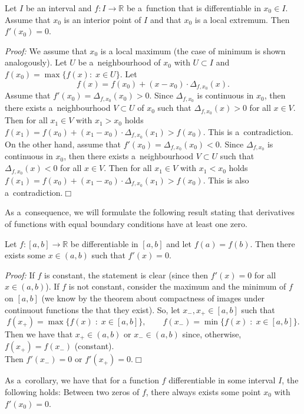 

\begin{Theorem}{}
    Let $I$ be an interval and $f:I \to\mathbb{R}$ be a~function that is differentiable in $x_0\in I$. Assume that $x_0$ is an interior point of $I$ and that $x_0$ is a local extremum. Then $f'(x_0)=0$.
\end{Theorem}

{\em Proof:} We assume that $x_0$ is a local maximum (the case of minimum is shown analogously). Let $U$ be a~neighbourhood of $x_0$ with $U\subset I$ and $f(x_0)=\max\{f(x):\;x\in U\}$. Let
\[f(x)=f(x_0)+(x-x_0)\cdot\Delta_{f,x_0}(x).\]
Assume that $f'(x_0)=\Delta_{f,x_0}(x_0)>0$. Since $\Delta_{f,x_0}$ is continuous in $x_0$, then there exists a~neighbourhood $V\subset U$ of $x_0$ such that $\Delta_{f,x_0}(x)>0$ for all $x\in V$. Then for all $x_1\in V$ with $x_1>x_0$ holds $f(x_1)=f(x_0)+(x_1-x_0)\cdot\Delta_{f,x_0}(x_1)>f(x_0)$. This is a~contradiction.\\
On the other hand, assume that $f'(x_0)=\Delta_{f,x_0}(x_0)<0$. Since $\Delta_{f,x_0}$ is continuous in $x_0$, then there exists a~neighbourhood $V\subset U$ such that $\Delta_{f,x_0}(x)<0$ for all $x\in V$. Then for all $x_1\in V$ with $x_1<x_0$ holds $f(x_1)=f(x_0)+(x_1-x_0)\cdot\Delta_{f,x_0}(x_1)>f(x_0)$. This is also a~contradiction.$\Box$

As a~consequence, we will formulate the following result stating that derivatives of functions with equal boundary conditions have at least one zero.
\begin{Theorem}
Let $f:[a,b]\to\mathbb{R}$ be differentiable in $[a,b]$ and let $f(a)=f(b)$. Then there exists some $x\in(a,b)$ such that $f'(x)=0$.
\end{Theorem}
{\em Proof:} If $f$ is constant, the statement is clear (since then $f'(x)=0$ for all $x\in(a,b)$). If $f$ is not constant, consider the maximum and the minimum of $f$ on $[a,b]$ (we know by the theorem about compactness of images under continuout functions the that they exist). So, let $x_-,x_+\in[a,b]$ such that
\[f(x_+)=\max\{f(x)\;:\;x\in[a,b]\},\qquad f(x_-)=\min\{f(x)\;:\;x\in[a,b]\}.\]
Then we have that $x_+\in(a,b)$ or $x_-\in(a,b)$ since, otherwise, $f(x_+)=f(x_-)$ (constant).\\
Then $f'(x_-)=0$ or $f'(x_+)=0$.\hfill$\Box$

As a~corollary, we have that for a function $f$ differentiable in some interval $I$, the following holds: Between two zeros of $f$, there always exists some point $x_0$ with $f'(x_0)=0$.

